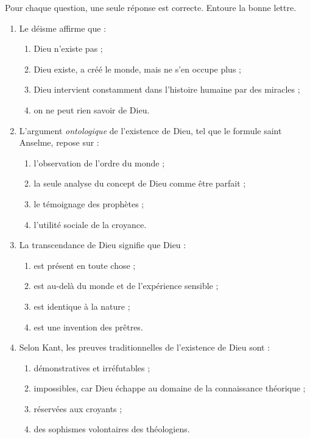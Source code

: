 \documentclass[11pt]{article}
\newcommand{\cle}[1]{{\popxbold\color{popdark}#1}}
\begin{document}
\begin{exercice}
Pour chaque question, une seule réponse est correcte. Entoure la bonne lettre.
\begin{enumerate}
\item Le \cle{déisme} affirme que :
\begin{enumerate}
\item Dieu n'existe pas ;
\item Dieu existe, a créé le monde, mais ne s'en occupe plus ;
\item Dieu intervient constamment dans l'histoire humaine par des miracles ;
\item on ne peut rien savoir de Dieu.
\end{enumerate}
\item L'argument \emph{ontologique} de l'existence de Dieu, tel que le formule saint Anselme, repose sur :
\begin{enumerate}
\item l'observation de l'ordre du monde ;
\item la seule analyse du concept de Dieu comme être parfait ;
\item le témoignage des prophètes ;
\item l'utilité sociale de la croyance.
\end{enumerate}
\item La \cle{transcendance} de Dieu signifie que Dieu :
\begin{enumerate}
\item est présent en toute chose ;
\item est au-delà du monde et de l'expérience sensible ;
\item est identique à la nature ;
\item est une invention des prêtres.
\end{enumerate}
\item Selon Kant, les preuves traditionnelles de l'existence de Dieu sont :
\begin{enumerate}
\item démonstratives et irréfutables ;
\item impossibles, car Dieu échappe au domaine de la connaissance théorique ;
\item réservées aux croyants ;
\item des sophismes volontaires des théologiens.
\end{enumerate}
\end{enumerate}
\end{exercice}
\end{document}
